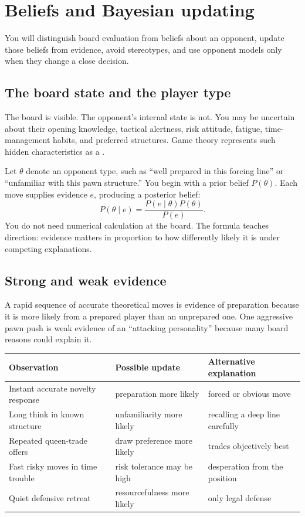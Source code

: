 \chapter{Beliefs and Bayesian updating}
\begin{learningbox}
You will distinguish board evaluation from beliefs about an opponent, update those beliefs from evidence, avoid stereotypes, and use opponent models only when they change a close decision.
\end{learningbox}

\section{The board state and the player type}
The board is visible. The opponent's internal state is not. You may be uncertain about their opening knowledge, tactical alertness, risk attitude, fatigue, time-management habits, and preferred structures. Game theory represents such hidden characteristics as a .

Let $\theta$ denote an opponent type, such as ``well prepared in this forcing line'' or ``unfamiliar with this pawn structure.'' You begin with a prior belief $P(\theta)$. Each move supplies evidence $e$, producing a posterior belief:
\[
P(\theta\mid e)=\frac{P(e\mid\theta)P(\theta)}{P(e)}.
\]
You do not need numerical calculation at the board. The formula teaches direction: evidence matters in proportion to how differently likely it is under competing explanations.

\section{Strong and weak evidence}
A rapid sequence of accurate theoretical moves is evidence of preparation because it is more likely from a prepared player than an unprepared one. One aggressive pawn push is weak evidence of an ``attacking personality'' because many board reasons could explain it.

\begin{center}
\begin{tabularx}{.94\textwidth}{p{}YY}
\toprule
\textbf{Observation} & \textbf{Possible update} & \textbf{Alternative explanation}\\
\midrule
Instant accurate novelty response & preparation more likely & forced or obvious move\\
Long think in known structure & unfamiliarity more likely & recalling a deep line carefully\\
Repeated queen-trade offers & draw preference more likely & trades objectively best\\
Fast risky moves in time trouble & risk tolerance may be high & desperation from the position\\
Quiet defensive retreat & resourcefulness more likely & only legal defense\\
\bottomrule
\end{tabularx}
\end{center}

